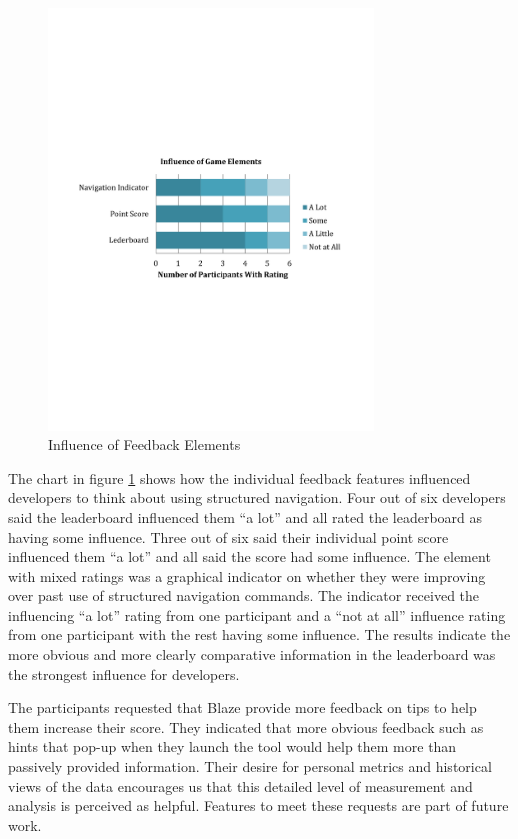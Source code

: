 \documentclass{sig-alternate}
\begin{document}
\begin{figure}
	\includegraphics[width=3.4in]{ElementInfluenceChart.pdf}
	\caption{Influence of Feedback Elements}
	\label{fig:elementInfluence}
\end{figure}

The chart in figure \ref{fig:elementInfluence} shows how the individual feedback features influenced developers to think about using structured navigation.  Four out of six developers said the leaderboard influenced them ``a lot'' and all rated the leaderboard as having some influence.  Three out of six  said their individual point score influenced them ``a lot'' and all said the score had some influence.  The element with mixed ratings was a graphical indicator on whether they were improving over past use of structured navigation commands.  The indicator received the influencing ``a lot'' rating from one participant and a ``not at all'' influence rating from one participant with the rest having some influence.  The results indicate the more obvious and more clearly comparative information in the leaderboard was the strongest influence for developers.

The participants requested that Blaze provide more feedback on tips to help them increase their score. They indicated that more obvious feedback such as hints that pop-up when they launch the tool would help them more than passively provided information.  Their desire for personal metrics and historical views of the data encourages us that this detailed level of measurement and analysis is perceived as helpful.  Features to meet these requests are part of future work.    
\end{document}
